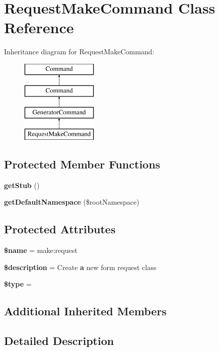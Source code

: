 \section{Request\+Make\+Command Class Reference}
\label{class_illuminate_1_1_foundation_1_1_console_1_1_request_make_command}
Inheritance diagram for Request\+Make\+Command\+:\begin{figure}[H]
\begin{center}
\leavevmode
\includegraphics[height=4.000000cm]{class_illuminate_1_1_foundation_1_1_console_1_1_request_make_command}
\end{center}
\end{figure}
\subsection*{Protected Member Functions}
\begin{DoxyCompactItemize}
\item 
{\bf get\+Stub} ()
\item 
{\bf get\+Default\+Namespace} (\$root\+Namespace)
\end{DoxyCompactItemize}
\subsection*{Protected Attributes}
\begin{DoxyCompactItemize}
\item 
{\bf \$name} = \textquotesingle{}make\+:request\textquotesingle{}
\item 
{\bf \$description} = \textquotesingle{}Create {\bf a} new form request class\textquotesingle{}
\item 
{\bf \$type} = \textquotesingle{}
\end{DoxyCompactItemize}
\subsection*{Additional Inherited Members}


\subsection{Detailed Description}


